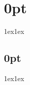 \documentclass{article}
\begin{document}
\titlespacing*\section{0pt}{1ex}{1ex}
\titlespacing*\subsection{0pt}{1ex}{1ex}
%
\setlength\abovecaptionskip{8pt}
\setlength\belowcaptionskip{-15pt}
\setlength\textfloatsep{0pt}
%
\setlength\abovedisplayskip{1pt}
\setlength\belowdisplayskip{1pt}

\begin{multicols*}{3}

\end{multicols*}
\end{document}
